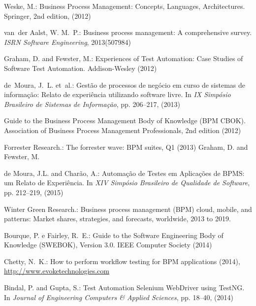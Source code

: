 \documentclass[runningheads,a4paper]{llncs}
\begin{document}
\begin{thebibliography}{4}

Weske, M.: Business Process Management: Concepts, Languages, Architectures. Springer, 2nd edition, (2012)

van~der Aalst, W. M.~P.: Business process management: A comprehensive survey. {\em ISRN Software Engineering}, 2013(507984)

Graham, D. and Fewster, M.: Experiences of Test Automation: Case Studies of Software Test Automation. Addison-Wesley (2012)

de~Moura, J.~L. et~al.: Gestão de processos de negócio em curso de sistemas de
  informação: Relato de experiência utilizando software livre. In {\em IX Simpósio Brasileiro de Sistemas de Informação}, pp.
  206--217, (2013)

 Guide to the Business Process Management Body of Knowledge (BPM
  CBOK). Association of Business Process Management Professionals, 2nd
  edition (2012)

Forrester Research.: The forrester wave: {BPM} suites, {Q1} (2013)
Graham, D. and Fewster, M.

de Moura, J.L. and Charão, A.: Automação de Testes em Aplicações de BPMS: um Relato de Experiência. In {\em XIV Simpósio Brasileiro de Qualidade de Software}, pp.
  212--219, (2015)

Winter Green Research.: Business process management (BPM) cloud, mobile, and patterns: Market shares, strategies, and forecasts, worldwide, 2013 to 2019.

Bourque, P. e Fairley, R.~E.: Guide to the Software Engineering Body of Knowledge (SWEBOK), Version 3.0. IEEE Computer Society (2014)

 Chetty, N.~K.: How to perform workflow testing for BPM applications (2014), \url{http://www.evoketechnologies.com}


Bindal, P. and Gupta, S.: Test Automation Selenium WebDriver using TestNG. In {\em Journal of Engineering Computers \& Applied Sciences}, pp.
  18--40, (2014)



\end{thebibliography}
\end{document}
